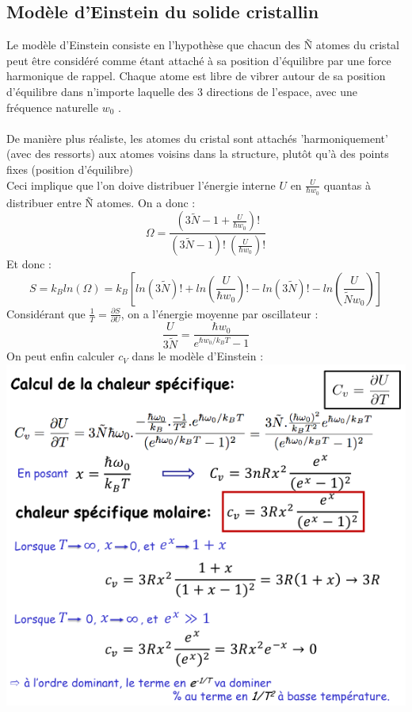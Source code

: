 \documentclass{article}
\begin{document}
        \subsection{Modèle d'Einstein du solide cristallin}
            Le modèle d’Einstein consiste en l’hypothèse que chacun des
            Ñ atomes du cristal peut être considéré comme étant attaché à sa position
            d’équilibre par une force harmonique de rappel.
            Chaque atome est libre de vibrer autour de sa
            position d’équilibre dans n’importe laquelle des
            3 directions de l’espace, avec une fréquence
            naturelle $w_0$ . \\\\
            De manière plus réaliste, les atomes du cristal sont attachés 'harmoniquement' (avec des ressorts) aux atomes voisins dans la structure, plutôt
            qu’à des points fixes (position d’équilibre) \\
            Ceci implique que l'on doive distribuer l'énergie interne $U$ en $\frac{U}{\hbar w_0}$ quantas à distribuer entre Ñ atomes.
            On a donc :
            $$
            \Omega = \frac{(3 \tilde N - 1 + \frac{U}{\hbar w_0})!}{(3 \tilde N -1)! \: (\frac{U}{\hbar w_0})!}
            $$
            Et donc :
            $$
            S = k_B ln(\Omega) = k_B [ln(3 \tilde N)! + ln(\frac{U}{\hbar w_0})! - ln(3 \tilde N)! - ln(\frac{U}{\tilde N w_0})]
            $$
            Considérant que $\frac{1}{T} = \frac{\partial S}{\partial U}$, on a l'énergie moyenne par oscillateur :
            $$
            \frac{U}{3 \tilde N} = \frac{\hbar w_0}{e^{\hbar w_0 / k_B T} - 1}
            $$
            On peut enfin calculer $c_V$ dans le modèle d'Einstein : \\
            \includegraphics[scale = .5]{c_v_einstein.png}
\end{document}
